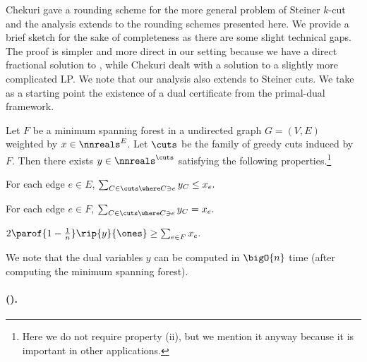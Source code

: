 \documentclass{toc}
\begin{document}
Chekuri \etal \cite{cgn-06} gave a rounding scheme for the more
general problem of Steiner $k$-cut and the analysis extends to the
rounding schemes presented here. We provide a brief sketch for the
sake of completeness as there are some slight technical gaps. The
proof is simpler and more direct in our setting because we have a
direct fractional solution to , while Chekuri \etal
\cite{cgn-06} dealt with a solution to a slightly more complicated
LP. We note that our analysis also extends to Steiner cuts.  We take
as a starting point the existence of a dual certificate from the
primal-dual framework.

\begin{lemma}[{\cite{gw-95,gw-96}}]
   Let $F$ be a minimum spanning forest in a
  undirected graph $G = (V,E)$ weighted by $x \in \nnreals^{E}$. Let
  $\cuts$ be the family of greedy cuts induced by $F$. Then there
  exists $y \in \nnreals^{\cuts}$ satisfying the following
  properties.\footnote{Here we do not require property (ii), but we
    mention it anyway because it is important in other applications.}
  \begin{mathresults}
  \item For each edge $e \in E$,
    \begin{math}
      \sum_{C \in \cuts \where C \ni e} y_C \leq x_e.
    \end{math}
  \item For each edge $e \in F$,
    \begin{math}
      \sum_{C \in \cuts \where C \ni e} y_C = x_e.
    \end{math}
  \item
    \begin{math}
      2 \parof{1 - \frac{1}{n}}\rip{y}{\ones} \geq \sum_{e \in F} x_e.
    \end{math}
  \end{mathresults}
\end{lemma}

We note that the dual variables $y$ can be computed in $\bigO{n}$ time
(after computing the minimum spanning forest).

%
%
%
%
%
%

%
%
%
%

\paragraph{ {\normalfont
    (\cite{cgn-06})}.}{\emph{\GreedyCutsApx}}
\end{document}
